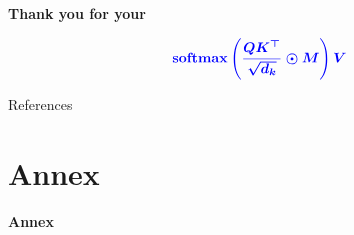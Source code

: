 \documentclass[9pt,dvipsnames]{beamer}
\begin{document}
\begin{frame}[c]

	\centering

	{\Huge \textbf{Thank you for your}}

	\vspace{0.5cm}

	{\Huge
		\begin{equation*}
			{\color{blue}\boldsymbol{\operatorname{softmax}\left(\frac{QK^\top}{\sqrt{d_k}} \odot M \right)V}}
		\end{equation*}
	}

	\vspace{0.5cm}

\end{frame}
\begin{frame}[allowframebreaks]{References}
	\tiny
	\printbibliography %
\end{frame}
\section{Annex}
\begin{frame}[c]

    \centering
    \Huge \textbf{Annex}

\end{frame}
\end{document}
